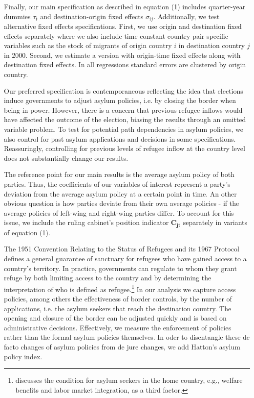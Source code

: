 \documentclass[a4paper,12pt]{article}
\begin{document}
Finally, our main specification as described in equation (1) includes quarter-year dummies $\tau_t$ and destination-origin fixed effects $\sigma_{ij}$. Additionally, we test alternative fixed effects specifications. First, we use origin and destination fixed effects separately where we also include time-constant country-pair specific variables such as the stock of migrants of origin country $i$ in destination country $j$ in 2000. Second, we estimate a version with origin-time fixed effects along with destination fixed effects. In all regressions standard errors are clustered by origin country.

Our preferred specification is contemporaneous reflecting the idea that elections induce governments to adjust asylum policies, i.e. by closing the border when being in power. However, there is a concern that previous refugee inflows would have affected the outcome of the election, biasing the results through an omitted variable problem. To test for potential path dependencies in asylum policies, we also control for past asylum applications and decisions in some specifications. Reassuringly, controlling for previous levels of refugee inflow at the country level does not substantially change our results. 

The reference point for our main results is the average asylum policy of both parties. Thus, the coefficients of our variables of interest represent a party's deviation from the average asylum policy at a certain point in time. An other obvious question is how parties deviate from their own average policies - if the average policies of left-wing and right-wing parties differ. To account for this issue, we include the ruling cabinet's position indicator $\mathbf{C_{jt}}$ separately in variants of equation (1).

The 1951 Convention Relating to the Status of Refugees and its 1967 Protocol defines a general guarantee of sanctuary for refugees who have gained access to a country's territory. In practice, governments can regulate to whom they grant refuge by both limiting access to the country and by determining the interpretation of who is defined as refugee.\footnote{\citet{hatton2009} discusses the condition for asylum seekers in the home country, e.g., welfare benefits and labor market integration, as a third factor.} In our analysis we capture access policies, among others the effectiveness of border controls, by the number of applications, i.e. the asylum seekers that reach the destination country. The opening and closure of the border can be adjusted quickly and is based on administrative decisions. Effectively, we measure the enforcement of policies rather than the formal asylum policies themselves. In oder to disentangle these de facto changes of asylum policies from de jure changes, we add Hatton's asylum policy index.
\end{document}
